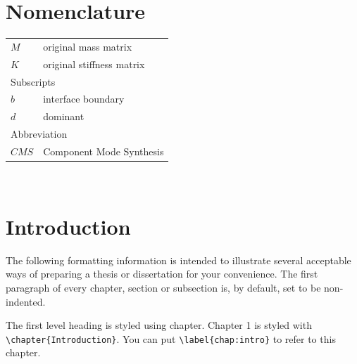 \documentclass{report}
\begin{document}
\listoftables
{}

\listoffigures
{}

\chapter*{Nomenclature}
\begin{tabular}{p{}p{}}
$M$	& original mass matrix\\
$K$	& original stiffness matrix\\[30pt]
\multicolumn{2}{l}{Subscripts}\\
$b$ & interface boundary\\
$d$ & dominant\\[30pt]
\multicolumn{2}{l}{Abbreviation}\\
$CMS$ & Component Mode Synthesis\\
\end{tabular}

\newpage 
~%

\chapter{Introduction}\label{chap:intro}
The following formatting information is intended to illustrate several acceptable ways of preparing a thesis or dissertation for your convenience.
The first paragraph of every chapter, section or subsection is, by default, set to be non-indented.

The first level heading is styled using chapter.
Chapter 1 is styled with\\ \verb|\chapter{Introduction}|.
You can put \verb|\label{chap:intro}| to refer to this chapter.
\end{document}
